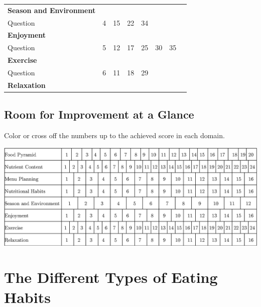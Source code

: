 \documentclass[../main.tex]{subfiles}
\begin{document}
\begin{tabular}{l|p{10mm}|p{10mm}|p{10mm}|p{10mm}|p{10mm}|p{10mm}||l|}
  \textbf{Season and Environment} & & & & & & & \\[2ex] \cline{1-5} \cline{8-8}
  \cellcolor{lightgray} Question & \cellcolor{lightgray} 4 & \cellcolor{lightgray} 15 &
  \cellcolor{lightgray} 22 & \cellcolor{lightgray} 34 & & & \\
  \textbf{Enjoyment} & & & & & & & \\ [2ex] \hline
  \cellcolor{lightgray} Question & \cellcolor{lightgray} 5 & \cellcolor{lightgray} 12 &
  \cellcolor{lightgray} 17 & \cellcolor{lightgray} 25 & \cellcolor{lightgray} 30 &
  \cellcolor{lightgray} 35 & \\
  \textbf{Exercise} & & & & & & & \\ [2ex]\hline
  \cellcolor{lightgray} Question & \cellcolor{lightgray} 6 & \cellcolor{lightgray} 11 &
  \cellcolor{lightgray} 18 & \cellcolor{lightgray} 29 & &
 & \\
  \textbf{Relaxation} & & & & & & & \\ [2ex] \cline{1-5} \cline{8-8}

\end{tabular}

\subsection{Room for Improvement at a Glance}

Color or cross off the numbers up to the achieved score in each domain.


\includegraphics[width=\linewidth]{ImprovementNutr}

\section{The Different Types of Eating Habits}
\end{document}
